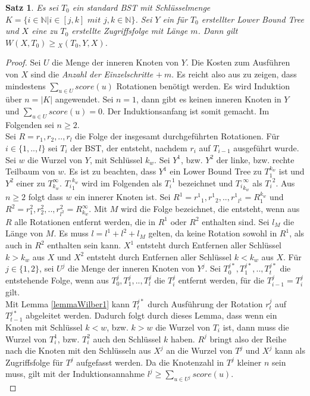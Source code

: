 \documentclass[a4paper,12pt]{article}
\newtheorem{Satz}{Satz}[section]
\begin{document}
\begin{Satz} \label{satzWilber1} Es sei $T_0$ ein standard BST mit Schlüsselmenge\\ ${K = \{  i \in \mathbb{N} \vert i \in \left[j,k\right] \textit{ mit } j,k \in  \mathbb{N} \}} $. Sei $Y$ ein für $T_0$ erstellter Lower Bound Tree und $X$ eine zu $T_0$ erstellte Zugriffsfolge mit Länge $m$. Dann gilt\\  $W\left(X, T_0\right) \geq {_X(T_0, Y, X)} $.  
\end{Satz}
\begin{proof}
	Sei $U$ die Menge der inneren Knoten von $Y$. Die Kosten zum Ausführen von $X$ sind die \textit{Anzahl der Einzelschritte} $ +~m$. Es reicht also aus zu zeigen, dass mindestens $\sum_{u \in U} {\mathit{score}} \left(u\right)$ Rotationen benötigt werden. Es wird Induktion über  $n = \vert K \vert$ angewendet. Sei $n = 1$, dann gibt es keinen inneren Knoten in $Y$ und $\sum_{u \in U} {\mathit{score}} \left(u\right) = 0$. Der Induktionsanfang ist somit gemacht. Im Folgenden sei $n \geq 2$.\\
	Sei $R = r_1,r_2,..,r_l$ die Folge der insgesamt durchgeführten Rotationen. Für $i \in \{1,..,l\}$ sei $T_i$ der BST, der entsteht, nachdem $r_i$ auf $T_{i-1}$ ausgeführt wurde. Sei $w$ die Wurzel von $Y$, mit Schlüssel $k_w$. Sei $Y^1$, bzw. $Y^2$ der linke, bzw. rechte Teilbaum von $w$. Es ist zu beachten, dass $Y^1$ ein Lower Bound Tree zu $T_{1}^{k_w}$ ist und  $Y^2$ einer zu $T^\infty_{k_w}$. ${T_{i}}_1^{k_w}$ wird im Folgenden als ${T_i}^1$ bezeichnet und ${T_{i}}_{k_w}^{\infty}$ als ${T_i}^2$. Aus $n \geq 2$ folgt dass $w$ ein innerer Knoten ist. Sei  $R^1 = {r^1}_1,{r^1}_2,..,{r^1}_{l^1} = R^{k_w}_1$ und $R^2 = r^2_1,r^2_2,..,r^2_{l^2} = R^\infty_{k_w}$. Mit $M$ wird die Folge bezeichnet, die entsteht, wenn aus $R$ alle Rotationen entfernt werden, die in $R^1$ oder $R^2$ enthalten sind. Sei $l_M$ die Länge von $M$. Es muss $l = l^1 + l^2 + l_M$ gelten, da keine Rotation sowohl in $R^1$, als auch in $R^2$ enthalten sein kann. $X^1$ entsteht durch Entfernen aller Schlüssel $k > k_w$ aus $X$ und  $X^2$ entsteht durch Entfernen aller Schlüssel $k < k_w$ aus $X$. Für $j \in \{1,2\}$, sei $U^j$ die Menge der inneren Knoten von $Y^j$. Sei $T^{j*}_0,T^{j*}_1,..,T^{j*}_{t}$ die entstehende Folge, wenn aus $T^{j}_0,T^{j}_1,..,T^{j}_{l}$ die $T^j_i$ entfernt werden, für die $T^j_{i-1} = T^j_i$ gilt.\\ Mit Lemma \ref{lemmaWilber1} kann  $T^{j*}_{t}$ durch Ausführung der Rotation $r^j_t$ auf $T^{j*}_{t-1}$ abgeleitet werden. Dadurch folgt durch dieses Lemma, dass wenn ein Knoten mit Schlüssel $k < w$, bzw. $k > w$ die Wurzel von $T_i$ ist, dann muss die Wurzel von $T^1_i$, bzw. $T^2_i$ auch den Schlüssel $k$ haben. $R^j$ bringt also der Reihe nach die Knoten mit den Schlüsseln aus $X^j$ an die Wurzel von $T^j$ und  $X^j$ kann als Zugriffsfolge für $T^j$ aufgefasst werden. Da die Knotenzahl in $T^j$ kleiner $n$ sein muss, gilt mit der Induktionsannahme  $l^j \geq \sum_{u \in U^j} {\mathit{score}} (u)$.\\

\end{proof}
\end{document}
